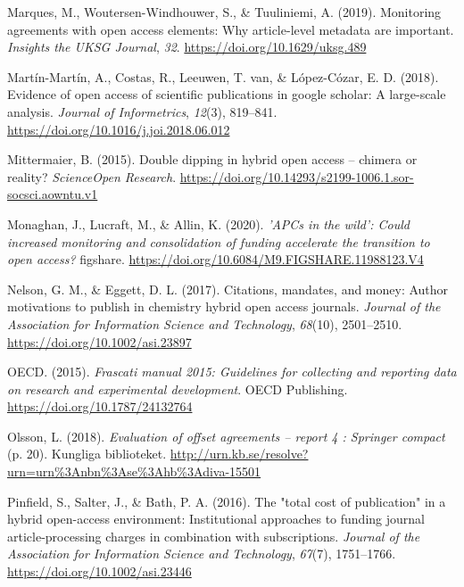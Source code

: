 \documentclass[a4paper,man,floatsintext,longtable,noextraspace,12pt]{apa6}
\newlength{\cslhangindent}
\newenvironment{cslreferences}%
  {\setlength{\parindent}{0pt}%
  \everypar{\setlength{\hangindent}{\cslhangindent}}\ignorespaces}%
  {\par}
\begin{document}
\begin{cslreferences}
\leavevmode\hypertarget{ref-Marques_2019}{}%
Marques, M., Woutersen-Windhouwer, S., \& Tuuliniemi, A. (2019).
Monitoring agreements with open access elements: Why article-level
metadata are important. \emph{Insights the UKSG Journal}, \emph{32}.
\url{https://doi.org/10.1629/uksg.489}

\leavevmode\hypertarget{ref-Mart_n_Mart_n_2018}{}%
Martín-Martín, A., Costas, R., Leeuwen, T. van, \& López-Cózar, E. D.
(2018). Evidence of open access of scientific publications in google
scholar: A large-scale analysis. \emph{Journal of Informetrics},
\emph{12}(3), 819--841. \url{https://doi.org/10.1016/j.joi.2018.06.012}

\leavevmode\hypertarget{ref-Mittermaier_2015}{}%
Mittermaier, B. (2015). Double dipping in hybrid open access -- chimera
or reality? \emph{ScienceOpen Research}.
\url{https://doi.org/10.14293/s2199-1006.1.sor-socsci.aowntu.v1}

\leavevmode\hypertarget{ref-Monaghan_2020}{}%
Monaghan, J., Lucraft, M., \& Allin, K. (2020). \emph{'APCs in the
wild': Could increased monitoring and consolidation of funding
accelerate the transition to open access?} figshare.
\url{https://doi.org/10.6084/M9.FIGSHARE.11988123.V4}

\leavevmode\hypertarget{ref-Nelson_2017}{}%
Nelson, G. M., \& Eggett, D. L. (2017). Citations, mandates, and money:
Author motivations to publish in chemistry hybrid open access journals.
\emph{Journal of the Association for Information Science and
Technology}, \emph{68}(10), 2501--2510.
\url{https://doi.org/10.1002/asi.23897}

\leavevmode\hypertarget{ref-Frascati}{}%
OECD. (2015). \emph{Frascati manual 2015: Guidelines for collecting and
reporting data on research and experimental development}. OECD
Publishing. \url{https://doi.org/10.1787/24132764}

\leavevmode\hypertarget{ref-Olsson1271866}{}%
Olsson, L. (2018). \emph{Evaluation of offset agreements -- report 4 :
Springer compact} (p. 20). Kungliga biblioteket.
\url{http://urn.kb.se/resolve?urn=urn\%3Anbn\%3Ase\%3Ahb\%3Adiva-15501}

\leavevmode\hypertarget{ref-Pinfield_2016}{}%
Pinfield, S., Salter, J., \& Bath, P. A. (2016). The "total cost of
publication" in a hybrid open-access environment: Institutional
approaches to funding journal article-processing charges in combination
with subscriptions. \emph{Journal of the Association for Information
Science and Technology}, \emph{67}(7), 1751--1766.
\url{https://doi.org/10.1002/asi.23446}


\end{cslreferences}
\end{document}
